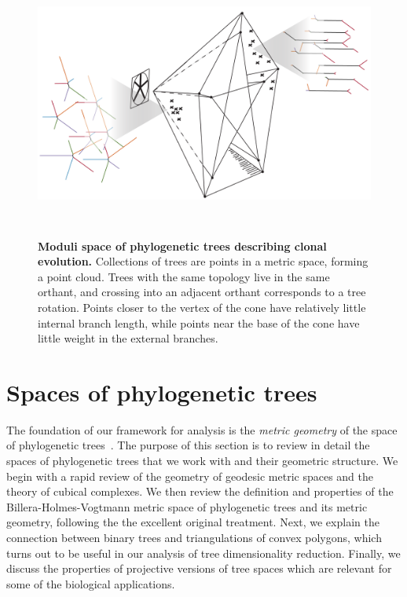 \documentclass[a4paper,11pt]{article}
\begin{document}
\begin{figure}
    \centering
    \includegraphics[height=3.5in]{../figures/illustration_BHV_5.png}
    \caption{{\bf Moduli space of phylogenetic trees describing clonal evolution.} Collections of trees are points in a metric space, forming a point cloud.  Trees with the same topology live in the same orthant, and crossing into an adjacent orthant corresponds to a tree rotation.  Points closer to the vertex of the cone have relatively little internal branch length, while points near the base of the cone have little weight in the external branches.}
    \label{fig:illustration_2}
\end{figure}



\section{Spaces of phylogenetic trees}\label{sec:phylospace}

The foundation of our framework for analysis is the {\em metric geometry} of the space of phylogenetic trees~\cite{billera2001geometry}.
The purpose of this section is to review in detail the spaces of phylogenetic trees that we work with and their geometric structure.
We begin with a rapid review of the geometry of geodesic metric spaces and the theory of cubical complexes.
We then review the definition and properties of the Billera-Holmes-Vogtmann metric space of phylogenetic trees and its metric geometry, following the the excellent original treatment.
Next, we explain the connection between binary trees and triangulations of convex polygons, which turns out to be useful in our analysis of tree dimensionality reduction.
Finally, we discuss the properties of projective versions of tree spaces which are relevant for some of the biological applications.
\end{document}
